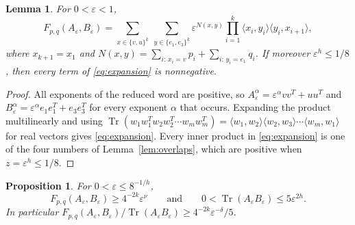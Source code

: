 \documentclass{amsart}
\newtheorem{proposition}[theorem]{Proposition}
\newtheorem{lemma}[theorem]{Lemma}
\theoremstyle{definition}
\theoremstyle{remark}
\numberwithin{equation}{section}
\newcommand{\Tr}{\operatorname{Tr}}
\begin{document}
\begin{lemma}\label{lem:expansion}
For $0<\varepsilon<1$,
\begin{equation}\label{eq:expansion}
F_{p,q}(A_\varepsilon,B_\varepsilon)=\sum_{x\in\{v,u\}^k}\ \sum_{y\in\{e_1,e_3\}^k}\varepsilon^{N(x,y)}\prod_{i=1}^{k}\langle x_i,y_i\rangle\langle y_i,x_{i+1}\rangle,
\end{equation}
where $x_{k+1}=x_1$ and $N(x,y)=\sum_{i:\,x_i=v}p_i+\sum_{i:\,y_i=e_1}q_i$. If moreover $\varepsilon^h\le 1/8$, then every term of \eqref{eq:expansion} is nonnegative.
\end{lemma}

\begin{proof}
All exponents of the reduced word are positive, so $A_\varepsilon^{\alpha}=\varepsilon^\alpha vv^T+uu^T$ and $B_\varepsilon^{\alpha}=\varepsilon^\alpha e_1e_1^T+e_3e_3^T$ for every exponent $\alpha$ that occurs. Expanding the product multilinearly and using $\Tr(w_1w_1^T w_2w_2^T\cdots w_mw_m^T)=\langle w_1,w_2\rangle\langle w_2,w_3\rangle\cdots\langle w_m,w_1\rangle$ for real vectors gives \eqref{eq:expansion}. Every inner product in \eqref{eq:expansion} is one of the four numbers of Lemma~\ref{lem:overlaps}, which are positive when $z=\varepsilon^h\le 1/8$.
\end{proof}

\begin{proposition}\label{prop:psd}
For $0<\varepsilon\le 8^{-1/h}$,
\[
F_{p,q}(A_\varepsilon,B_\varepsilon)\ge 4^{-2k}\varepsilon^{\nu}\qquad\text{and}\qquad 0<\Tr(A_\varepsilon B_\varepsilon)\le 5\varepsilon^{2h}.
\]
In particular $F_{p,q}(A_\varepsilon,B_\varepsilon)/\Tr(A_\varepsilon B_\varepsilon)\ge 4^{-2k}\varepsilon^{-\delta}/5$.
\end{proposition}
\end{document}
